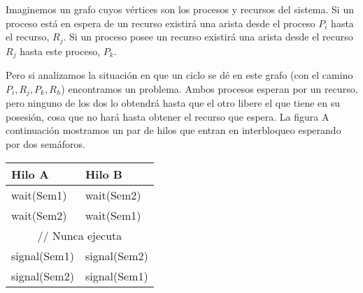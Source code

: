Imaginemos un grafo cuyos vértices son los procesos y recursos del sistema.
Si un proceso está en espera de un recurso existirá una arista desde el proceso \(P_i\) hasta el recurso, \(R_j\).
Si un proceso posee un recurso existirá una arista desde el recurso \(R_j\) hasta este proceso, \(P_k\).

\begin{center}
\end{center}

Pero si analizamos la situación en que un ciclo se dé en este grafo (con el camino \(P_i,R_j,P_k,R_h\)) encontramos un problema.
Ambos procesos esperan por un recurso, pero ninguno de los dos lo obtendrá hasta que el otro libere el que tiene en su posesión,
cosa que no hará hasta obtener el recurso que espera.
La figura A continuación mostramos un par de hilos que entran en interbloqueo esperando por dos semáforos.

\begin{center}
\begin{tabular}{|l|l|}
	Hilo A & Hilo B \\ \hline
	wait(Sem1) & wait(Sem2) \\
	wait(Sem2) & wait(Sem1) \\
	\multicolumn{2}{|c|}{// Nunca ejecuta} \\
	signal(Sem1) & signal(Sem2) \\
	signal(Sem2) & signal(Sem1) \\
	\hline
\end{tabular}
\end{center}
